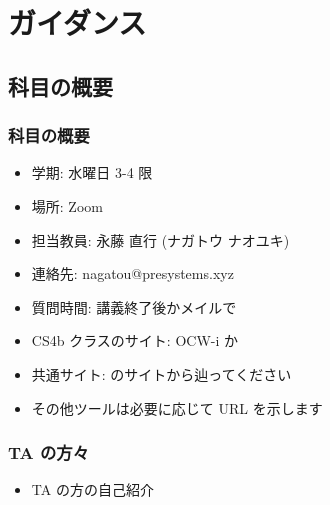 \section{ガイダンス}
%
%
\subsection{科目の概要}
\begin{frame}
\frametitle{科目の概要}
  \begin{itemize}
\item 学期: 水曜日 3-4 限
\item 場所: Zoom
\item 担当教員: 永藤 直行 (ナガトウ ナオユキ)
\item 連絡先: nagatou@presystems.xyz
\item 質問時間: 講義終了後かメイルで
\item CS4b クラスのサイト: OCW-i か \href{https://sites.google.com/a/presystems.xyz/sample/home/elementary-computer-science}{} 
\item 共通サイト: \href{http://www.edu.gsic.titech.ac.jp/}{}のサイトから辿ってください
\item その他ツールは必要に応じて URL を示します
  \end{itemize}
\end{frame}
\begin{frame}
\frametitle{TA の方々}
  \begin{itemize}
\item TA の方の自己紹介
  \end{itemize}
\end{frame}
%
%
%
%
